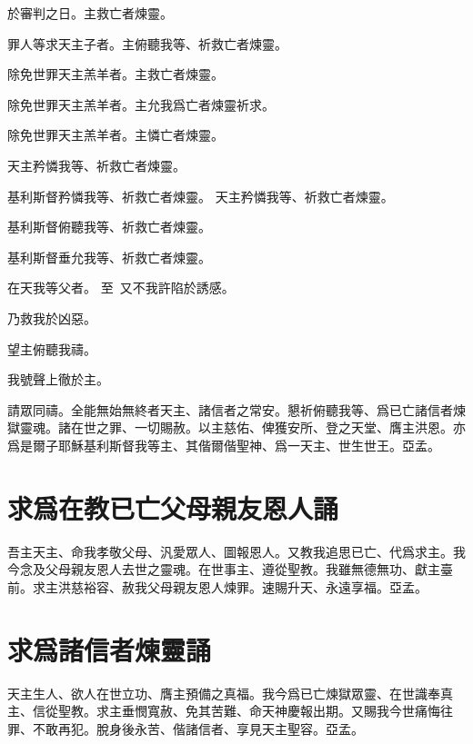 \versicle 於審判之日。\hfill \response 主救亡者煉靈。

\versicle 罪人等求天主子者。\hfill \response 主俯聽我等、祈救亡者煉靈。

\versicle 除免世罪天主羔羊者。\hfill \response 主救亡者煉靈。

\versicle 除免世罪天主羔羊者。\hfill \response 主允我爲亡者煉靈祈求。

\versicle 除免世罪天主羔羊者。\hfill \response 主憐亡者煉靈。

\versicle 天主矜憐我等、祈救亡者煉靈。

\Response 基利斯督矜憐我等、祈救亡者煉靈。  天主矜憐我等、祈救亡者煉靈。

\versicle 基利斯督俯聽我等、祈救亡者煉靈。

\Response 基利斯督垂允我等、祈救亡者煉靈。

\versicle 在天我等父者。 {\small 至}\ 又不我許陷於誘感。

\Response 乃救我於凶惡。

\versicle 望主俯聽我禱。

\Response 我號聲上徹於主。

\versicle 請眾同禱。{\cspace}全能無始無終者天主、諸信者之常安。懇祈俯聽我等、爲已亡諸信者煉獄靈魂。諸在世之罪、一切賜赦。以主慈佑、俾獲安所、登之天堂、膺主洪恩。亦爲是爾子耶穌基利斯督我等主、其偕爾偕聖神、爲一天主、世生世王。{\cspace}亞孟。

\section*{求爲在教已亡父母親友恩人誦}
吾主天主、命我孝敬父母、汎愛眾人、圖報恩人。又教我追思已亡、代爲求主。我今念及父母親友恩人去世之靈魂。在世事主、遵從聖教。我雖無德無功、獻主臺前。求主洪慈裕容、赦我父母親友恩人煉罪。速賜升天、永遠享福。{\cspace}亞孟。

\section*{求爲諸信者煉靈誦}
天主生人、欲人在世立功、膺主預備之真福。我今爲已亡煉獄眾靈、在世識奉真主、信從聖教。求主垂憫寬赦、免其苦難、命天神慶報出期。又賜我今世痛悔往罪、不敢再犯。脫身後永苦、偕諸信者、享見天主聖容。{\cspace}亞孟。
